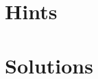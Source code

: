 \documentclass[oneside]{book}
\numberwithin{equation}{section}
\begin{document}
\section*{Hints}

\section*{Solutions}




\printbibliography[heading=bibintoc]
	
\end{document}
